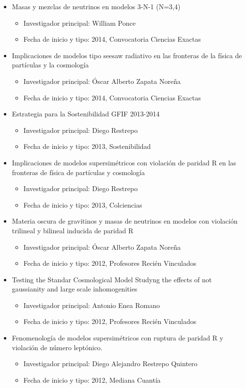 \documentclass{article}
\begin{document}
\begin{itemize}
\item Masas y mezclas de neutrinos en modelos 3-N-1 (N=3,4)
\begin{itemize}
\item Investigador principal: William Ponce
\item Fecha de inicio y tipo: 2014, Convocatoria Ciencias Exactas
\end{itemize}
\item Implicaciones de modelos tipo seesaw radiativo en las fronteras de la física de partículas y la cosmología
\begin{itemize}
\item Investigador principal: Óscar Alberto Zapata Noreña
\item Fecha de inicio y tipo: 2014, Convocatoria Ciencias Exactas
\end{itemize}
\item Estrategia para la Sostenibilidad GFIF 2013-2014
\begin{itemize}
\item Investigador principal: Diego Restrepo
\item Fecha de inicio y tipo: 2013, Sostenibilidad
\end{itemize}
\item Implicaciones de modelos supersimétricos con violación de paridad R en las fronteras de física de partículas y cosmología
\begin{itemize}
\item Investigador principal: Diego Restrepo
\item Fecha de inicio y tipo: 2013, Colciencias
\end{itemize}
\item Materia oscura de gravitinos y masas de neutrinos en modelos con violación trilineal y bilineal inducida de paridad R
\begin{itemize}
\item Investigador principal: Óscar Alberto Zapata Noreña
\item Fecha de inicio y tipo: 2012, Profesores Recién Vinculados
\end{itemize}
\item Testing the Standar Cosmological Model Studyng the effects of not gaussianity and large scale inhomogenities
\begin{itemize}
\item Investigador principal: Antonio Enea Romano
\item Fecha de inicio y tipo: 2012, Profesores Recién Vinculados
\end{itemize}
\item Fenomenología de modelos supersimétricos con ruptura de paridad R y violación de número leptónico.
\begin{itemize}
\item Investigador principal: Diego Alejandro Restrepo Quintero
\item Fecha de inicio y tipo: 2012, Mediana Cuantía
\end{itemize}
\end{itemize}
\end{document}
